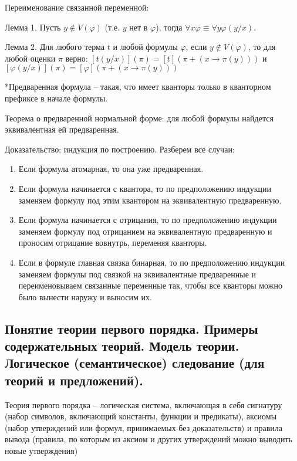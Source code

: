 \documentclass[a4paper, 10pt]{article}
\begin{document}
Переименование связанной переменной:

Лемма 1. Пусть $y\not\in V(\varphi)$ (т.е. $y$ нет в $\varphi$), тогда $\forall x\varphi \equiv \forall y\varphi(y/x)$.

Лемма 2. Для любого терма $t$ и любой формулы $\varphi$, если $y \not\in V(\varphi)$, то для любой оценки $\pi$ верно: $[t(y/x)](\pi)=[t](\pi + (x \to \pi(y)))$ и $[\varphi(y/x)](\pi)=[\varphi](\pi + (x \to \pi(y)))$

\hfill

*Предваренная формула -- такая, что имеет кванторы только в кванторном префиксе в начале формулы.

Теорема о предваренной нормальной форме: для любой формулы найдется эквивалентная ей предваренная.

Доказательство: индукция по построению. Разберем все случаи:

\begin{enumerate}
    \item Если формула атомарная, то она уже предваренная.
    \item Если формула начинается с квантора, то по предположению индукции заменяем формулу под этим квантором на эквивалентную предваренную.
    \item Если формула начинается с отрицания, то по предположению индукции заменяем формулу под отрицанием на эквивалентную предваренную и проносим отрицание вовнутрь, переменяя кванторы.
    \item Если в формуле главная связка бинарная, то по предположению индукции заменяем формулы под связкой на эквивалентные предваренные и переименовываем связанные переменные так, чтобы все кванторы можно было вынести наружу и выносим их.
\end{enumerate}

\subsection{Понятие теории первого порядка. Примеры содержательных теорий. Модель теории. Логическое (семантическое) следование (для теорий и предложений).}

Теория первого порядка -- логическая система, включающая в себя сигнатуру (набор символов, включающий константы, функции и предикаты), аксиомы (набор утверждений или формул, принимаемых без доказательств) и правила вывода (правила, по которым из аксиом и других утверждений можно выводить новые утверждения)
\end{document}
